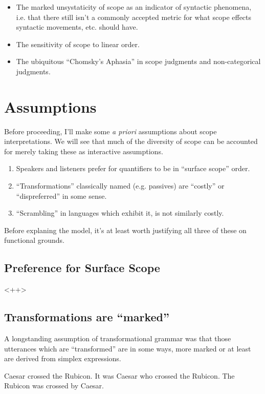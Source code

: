 \documentclass{article}
\begin{document}
\begin{itemize}
	\item The marked unsystaticity of scope as an indicator of syntactic phenomena, i.e. that there still isn't a commonly accepted metric for what scope effects syntactic movements, etc. should have.
	\item The sensitivity of scope to linear order.
	\item The ubiquitous ``Chomsky's Aphasia'' in scope judgments and non-categorical judgments.
\end{itemize}

\section{Assumptions\label{assump}}


Before proceeding, I'll make some \emph{a priori} assumptions about scope interpretations.
We will see that much of the diversity of scope can be accounted for merely taking these as interactive assumptions.

\begin{enumerate}
\item Speakers and listeners prefer for quantifiers to be in ``surface scope'' order.
\item ``Transformations'' classically named (e.g. passives) are ``costly'' or ``dispreferred'' in some sense.
\item ``Scrambling'' in languages which exhibit it, is not similarly costly.
\end{enumerate}

Before explaning the model, it's at least worth justifying all three of these on functional grounds.

\subsection{Preference for Surface Scope}

<++>

\subsection{Transformations are ``marked''}

A longstanding assumption of transformational grammar was that those utterances which are ``transformed'' are in some ways, more marked or at least are derived from simplex expressions.

\begin{exe}
	\ex\label{caes}
	\begin{xlist}
	\ex Caesar crossed the Rubicon.\label{simp}
	\ex It was Caesar who crossed the Rubicon.\label{celft}
	\ex The Rubicon was crossed by Caesar.\label{pass}
	\end{xlist}
\end{exe}
\end{document}
